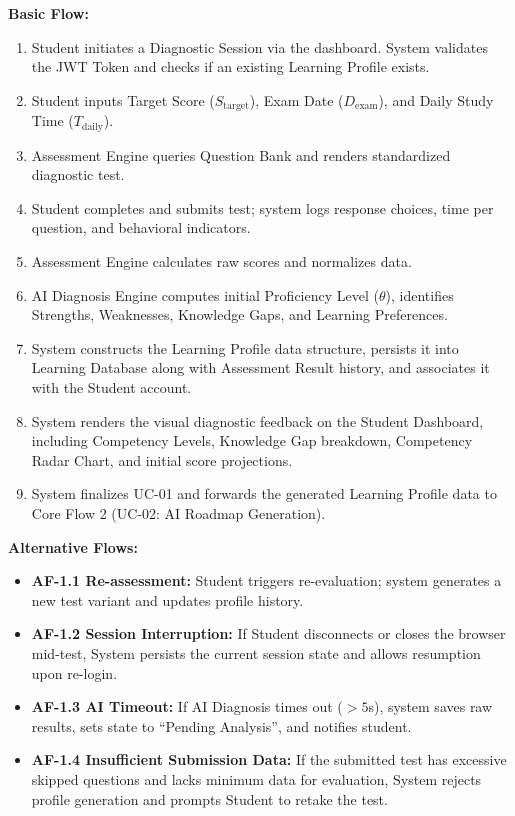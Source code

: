\documentclass[12pt,a4paper]{article}
\begin{document}
\vspace{0.2cm}
\noindent\textbf{Basic Flow:}
\begin{enumerate}[leftmargin=1.5em, itemsep=0.2em]
    \item Student initiates a Diagnostic Session via the dashboard. System validates the JWT Token and checks if an existing Learning Profile exists.
    \item Student inputs Target Score ($S_{\text{target}}$), Exam Date ($D_{\text{exam}}$), and Daily Study Time ($T_{\text{daily}}$).
    \item Assessment Engine queries Question Bank and renders standardized diagnostic test.
    \item Student completes and submits test; system logs response choices, time per question, and behavioral indicators.
    \item Assessment Engine calculates raw scores and normalizes data.
    \item AI Diagnosis Engine computes initial Proficiency Level ($\theta$), identifies Strengths, Weaknesses, Knowledge Gaps, and Learning Preferences.
    \item System constructs the Learning Profile data structure, persists it into Learning Database along with Assessment Result history, and associates it with the Student account.
    \item System renders the visual diagnostic feedback on the Student Dashboard, including Competency Levels, Knowledge Gap breakdown, Competency Radar Chart, and initial score projections.
    \item System finalizes UC-01 and forwards the generated Learning Profile data to Core Flow 2 (UC-02: AI Roadmap Generation).
\end{enumerate}

\noindent\textbf{Alternative Flows:}
\begin{itemize}[leftmargin=1.5em, itemsep=0.2em]
    \item \textbf{AF-1.1 Re-assessment:} Student triggers re-evaluation; system generates a new test variant and updates profile history.
    \item \textbf{AF-1.2 Session Interruption:} If Student disconnects or closes the browser mid-test, System persists the current session state and allows resumption upon re-login.
    \item \textbf{AF-1.3 AI Timeout:} If AI Diagnosis times out ($> 5$s), system saves raw results, sets state to ``Pending Analysis'', and notifies student.
    \item \textbf{AF-1.4 Insufficient Submission Data:} If the submitted test has excessive skipped questions and lacks minimum data for evaluation, System rejects profile generation and prompts Student to retake the test.
\end{itemize}
\end{document}
